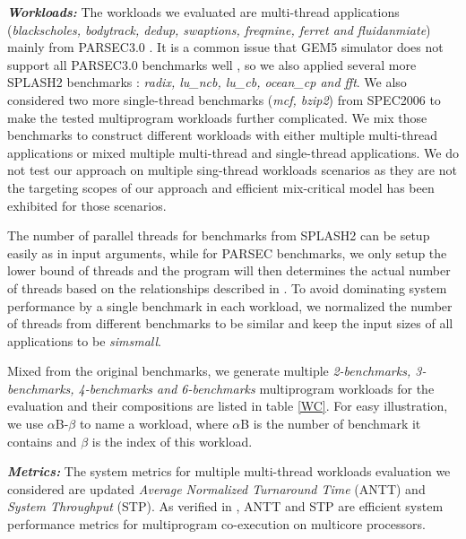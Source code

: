 \documentclass[sigplan,review,anonymous]{acmart}\settopmatter{printfolios=true,printccs=false,printacmref=false}
\begin{document}
\textbf{\textit{Workloads:}} The workloads we evaluated are multi-thread applications ({\it blackscholes, bodytrack, dedup, swaptions, freqmine, ferret and fluidanmiate}) mainly from PARSEC3.0 \cite{bienia11benchmarking}. It is a common issue that GEM5 simulator does not support all PARSEC3.0 benchmarks well \cite{endo2014micro}, so we also applied several more SPLASH2 benchmarks \cite{woo1995splash}: {\it radix, lu\_ncb, lu\_cb, ocean\_cp and fft}. We also considered two more single-thread benchmarks ({\it mcf, bzip2}) from SPEC2006 \cite{henning2006spec} to make the tested multiprogram workloads further complicated. 
We mix those benchmarks to construct different workloads with either multiple multi-thread applications or mixed multiple multi-thread and single-thread applications. We do not test our approach on multiple sing-thread workloads scenarios as they are not the targeting scopes of our approach and efficient mix-critical model \cite{han2018multicore} has been exhibited for those scenarios. 

The number of parallel threads for benchmarks from SPLASH2 can be setup easily as in input arguments, while for PARSEC benchmarks, we only setup the lower bound of threads and the program will then determines the actual number of threads based on the relationships described in \cite{southern2016analysis}. To avoid dominating system performance by a single benchmark in each workload, we normalized the number of threads from different benchmarks to be similar and keep the input sizes of all applications to be {\it simsmall}. 

Mixed from the original benchmarks, we generate multiple {\it 2-benchmarks, 3-benchmarks, 4-benchmarks and 6-benchmarks} multiprogram workloads for the evaluation and their compositions are listed in table \ref{WC}. For easy illustration, we use $\alpha$B-$\beta$ to name a workload, where $\alpha$B is the number of benchmark it contains and $\beta$ is the index of this workload.



\textbf{\textit{Metrics:}} The system metrics for multiple multi-thread workloads evaluation we considered are updated {\it Average Normalized Turnaround Time} (ANTT) and {\it System Throughput} (STP). As verified in \cite{eyerman2008system}, ANTT and STP are efficient system performance metrics for multiprogram co-execution on multicore processors. 
\end{document}
